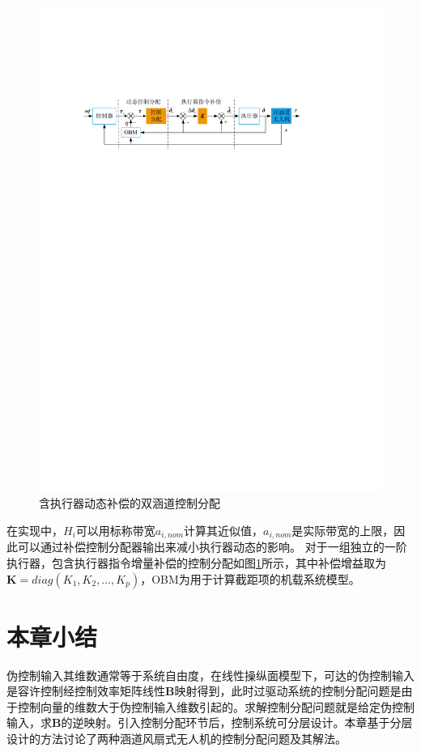 \begin{figure}[tbp]
	\centering	
	\includegraphics[scale=1]{Fig/TDF_allocation.pdf}
	\caption{\label{allocation}含执行器动态补偿的双涵道控制分配}
\end{figure}

在实现中，$H_{ {i}}$可以用标称带宽$a_{ {i,nom}}$计算其近似值，$a_{ {i,nom}}$是实际带宽的上限，因此可以通过补偿控制分配器输出来减小执行器动态的影响\cite{Oppenheimer_2004}。 对于一组独立的一阶执行器，包含执行器指令增量补偿的控制分配如图\ref{allocation}所示，其中补偿增益取为$\bm{K} = diag\left( K_1,K_2,\ldots,K_{ {p}} \right)$，OBM为用于计算截距项的机载系统模型。 
%
\section{本章小结}
%
伪控制输入其维数通常等于系统自由度，在线性操纵面模型下，可达的伪控制输入是容许控制经控制效率矩阵线性$ \bm{B} $映射得到，此时过驱动系统的控制分配问题是由于控制向量的维数大于伪控制输入维数引起的。求解控制分配问题就是给定伪控制输入，求$ \bm{B} $的逆映射。引入控制分配环节后，控制系统可分层设计。本章基于分层设计的方法讨论了两种涵道风扇式无人机的控制分配问题及其解法。

